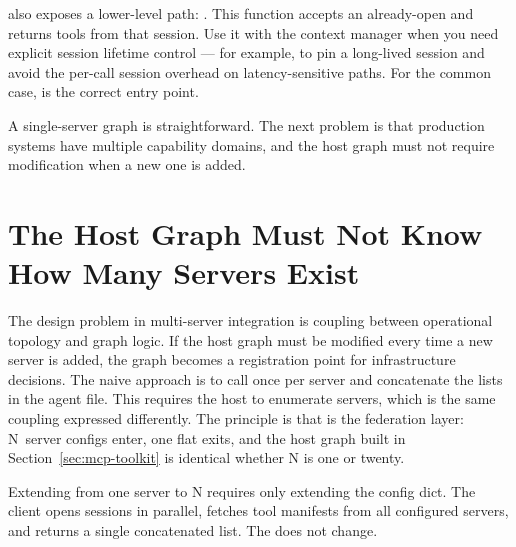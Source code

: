 \begin{notebox}
 also exposes a lower-level path:
.
This function accepts an already-open  and returns
tools from that session.
Use it with the 
context manager when you need explicit session lifetime control --- for
example, to pin a long-lived session and avoid the per-call session
overhead on latency-sensitive paths.
For the common case,  is the correct entry point.
\end{notebox}

A single-server graph is straightforward. The next problem is that
production systems have multiple capability domains, and the host graph
must not require modification when a new one is added.

\section{The Host Graph Must Not Know How Many Servers Exist}
\label{sec:mcp-multi}

The design problem in multi-server integration is coupling between
operational topology and graph logic. If the host graph must be modified
every time a new server is added, the graph becomes a registration point
for infrastructure decisions. The naive approach is to call
 once per server and concatenate the lists in the
agent file. This requires the host to enumerate servers, which is the
same coupling expressed differently. The principle is that
 is the federation layer: N~server configs
enter, one flat  exits, and the host graph built
in Section~\ref{sec:mcp-toolkit} is identical whether N is one or twenty.

Extending from one server to N requires only extending the config dict.
The client opens sessions in parallel, fetches tool manifests from all
configured servers, and returns a single concatenated list. The
 does not change.

